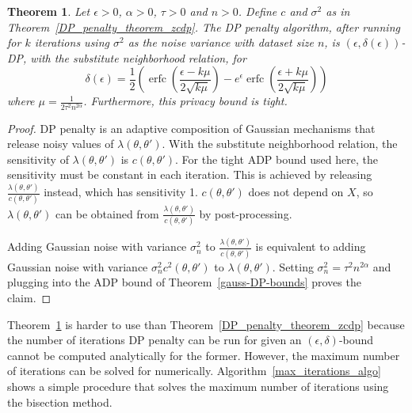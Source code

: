 \documentclass[english,twoside,openright]{HYgraduMLDS}
\newtheorem{theorem}{Theorem}
\DeclareMathOperator{\erfc}{erfc}
\begin{document}
\begin{theorem}\label{DP_penalty_theorem_adp}
    Let \(\epsilon > 0\), \(\alpha > 0\), \(\tau > 0\) and \(n > 0\).
    Define \(c\) and \(\sigma^{2}\) as in Theorem~\ref{DP_penalty_theorem_zcdp}.
    The DP penalty algorithm, after running for \(k\) iterations using \(\sigma^{2}\)
    as the noise variance with dataset size \(n\),
    is \((\epsilon, \delta(\epsilon))\)-DP, with the substitute neighborhood
    relation, for
    \[
        \delta(\epsilon) 
        = \frac{1}{2}\left(
            \erfc\left(\frac{\epsilon - k\mu}{2\sqrt{k\mu}}\right)
            - e^\epsilon \erfc\left(\frac{\epsilon + k\mu}{2\sqrt{k\mu}}\right)
        \right)
    \]
    where \(\mu = \frac{1}{2\tau^2 n^{2\alpha}}\). Furthermore, this privacy
    bound is tight.
\end{theorem}
\begin{proof}
    DP penalty is an adaptive composition of Gaussian mechanisms that release 
    noisy values of \(\lambda(\theta, \theta')\). With the substitute neighborhood
    relation, the sensitivity of \(\lambda(\theta, \theta')\) is
    \(c(\theta, \theta')\). For the tight ADP bound used here, the sensitivity must be 
    constant in each iteration. This is achieved by releasing 
    \(\frac{\lambda(\theta, \theta')}{c(\theta, \theta')}\) instead, which 
    has sensitivity 1. \(c(\theta, \theta')\) does not depend on \(X\), 
    so \(\lambda(\theta, \theta')\) can be obtained from 
    \(\frac{\lambda(\theta, \theta')}{c(\theta, \theta')}\) by post-processing.

    Adding Gaussian noise with variance \(\sigma_n^2\) to 
    \(\frac{\lambda(\theta, \theta')}{c(\theta, \theta')}\)
    is equivalent to adding Gaussian noise with variance 
    \(\sigma_n^2 c^2(\theta, \theta')\) to \(\lambda(\theta, \theta')\).
    Setting \(\sigma_n^2 = \tau^2n^{2\alpha}\) and plugging into 
    the ADP bound of Theorem~\ref{gauss-DP-bounds} proves the 
    claim.
\end{proof}

Theorem~\ref{DP_penalty_theorem_adp} is harder to use than 
Theorem~\ref{DP_penalty_theorem_zcdp} because the number of iterations
DP penalty can be run for given an \((\epsilon, \delta)\)-bound cannot be 
computed analytically for the former. However, the maximum number of iterations 
can be solved for numerically. Algorithm~\ref{max_iterations_algo} shows a simple
procedure that solves the maximum number of iterations using the bisection
method.
\end{document}
